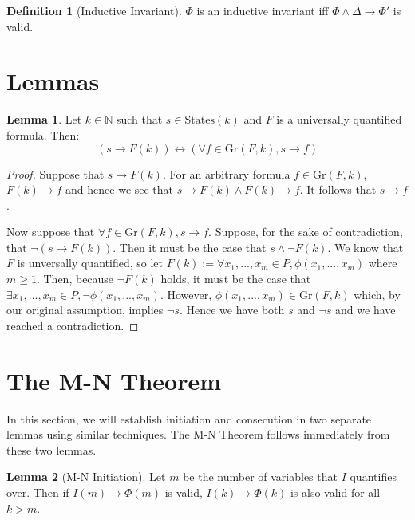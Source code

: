\documentclass[12pt]{article}
\theoremstyle{definition}
\newtheorem{lemma}{Lemma}
\newtheorem{definition}{Definition}
\theoremstyle{remark}
\newcommand{\states}{\text{States}}
\newcommand{\gr}{\text{Gr}}
\begin{document}
\begin{definition}[Inductive Invariant]
  $\Phi$ is an inductive invariant iff $\Phi \land \Delta \rightarrow \Phi'$ is valid.
\end{definition}



\section{Lemmas}
\begin{lemma}
  \label{lem:pnf-ground}
  Let $k \in \mathbb{N}$ such that $s \in \states(k)$ and $F$ is a universally quantified formula.  Then:
  $$(s \rightarrow F(k)) \leftrightarrow (\forall f \in \gr(F,k), s \rightarrow f)$$
\end{lemma}
\begin{proof}
  Suppose that $s \rightarrow F(k)$.  For an arbitrary formula $f \in \gr(F,k)$, $F(k) \rightarrow f$ and hence we see that $s \rightarrow F(k) \land F(k) \rightarrow f$.  It follows that $s \rightarrow f$.

  Now suppose that $\forall f \in \gr(F,k), s \rightarrow f$.  Suppose, for the sake of contradiction, that $\neg(s \rightarrow F(k))$.  Then it must be the case that $s \land \neg F(k)$.  We know that $F$ is unversally quantified, so let $F(k) := \forall x_1,...,x_m \in P, \phi(x_1,...,x_m)$ where $m \geq 1$.  Then, because $\neg F(k)$ holds, it must be the case that $\exists x_1,...,x_m \in P, \neg \phi(x_1,...,x_m)$.  However, $\phi(x_1,...,x_m) \in \gr(F,k)$ which, by our original assumption, implies $\neg s$.  Hence we have both $s$ and $\neg s$ and we have reached a contradiction.
\end{proof}



\section{The M-N Theorem}

In this section, we will establish initiation and consecution in two separate lemmas using similar techniques.  The M-N Theorem follows immediately from these two lemmas.

\begin{lemma}[M-N Initiation]
  Let $m$ be the number of variables that $I$ quantifies over.  Then if $I(m) \rightarrow \Phi(m)$ is valid, $I(k) \rightarrow \Phi(k)$ is also valid for all $k>m$.
\end{lemma}
\end{document}
